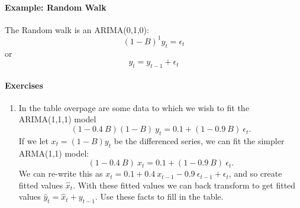 \documentclass[a4paper,11pt,oneside,onecolumn]{book}
\begin{document}
\paragraph{Example: Random Walk}
The Random walk is an ARIMA(0,1,0):
$$
(1-B)^1 y_t=\epsilon_t
$$
or 
$$
y_t=y_{t-1}+\epsilon_t
$$


\paragraph{Exercises}


\begin{enumerate}



\item  In the table overpage are some data to which we wish to fit the ARIMA(1,1,1) model
$$(1 - 0.4\ B) (1-B)\ y_t = 0.1 + (1-0.9\ B)\ \epsilon_t. $$
If we let $x_t = (1-B)y_t$ be the differenced series, we can fit the simpler ARMA(1,1) model:
$$(1 - 0.4\ B)\ x_t = 0.1 + (1-0.9\ B)\ \epsilon_t. $$
We can re-write this as $x_t= 0.1 + 0.4\ x_{t-1} - 0.9\ \epsilon_{t-1} + \epsilon_t$, and so create fitted values $\hat{x}_t$. With these fitted values we can back transform to get fitted values $\hat{y}_t = \hat{x}_t + y_{t-1}$. Use these facts to fill in the table.


\end{enumerate}
\end{document}

